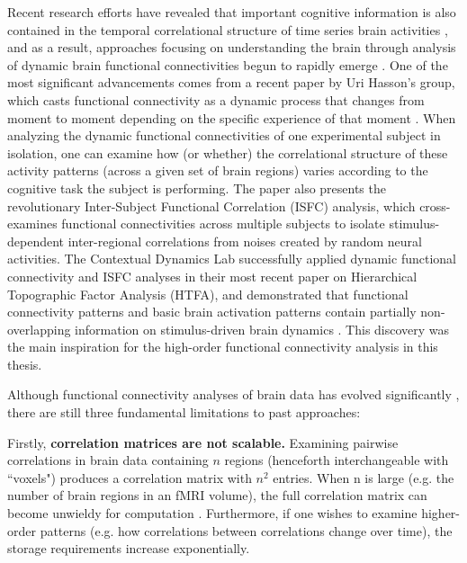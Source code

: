 \documentclass[11pt]{article}
\begin{document}
Recent research efforts have revealed that important cognitive information is also contained in the temporal correlational structure of time series brain activities \citep{davidson2016}, and as a result, approaches focusing on understanding the brain through analysis of dynamic brain functional connectivities begun to rapidly emerge \citep{Nigam2016}\citep{Hutchinson2013}. One of the most significant advancements comes from a recent paper by Uri Hasson's group, which casts functional connectivity as a dynamic process that changes from moment to moment depending on the specific experience of that moment \citep{hasson2016}. When analyzing the dynamic functional connectivities of one experimental subject in isolation, one can examine how (or whether) the correlational structure of these activity patterns (across a given set of brain regions) varies according to the cognitive task the subject is performing. The paper also presents the revolutionary Inter-Subject Functional Correlation (ISFC) analysis, which cross-examines functional connectivities across multiple subjects to isolate stimulus-dependent inter-regional correlations from noises created by random neural activities. The Contextual Dynamics Lab successfully applied dynamic functional connectivity and ISFC analyses in their most recent paper on Hierarchical Topographic Factor Analysis (HTFA), and demonstrated that functional connectivity patterns and basic brain activation patterns contain partially non-overlapping information on stimulus-driven brain dynamics \citep{jeremy2017}. This discovery was the main inspiration for the high-order functional connectivity analysis in this thesis.

Although functional connectivity analyses of brain data has evolved significantly \citep{olaf2005}\citep{khambhati2017}, there are still three fundamental limitations to past approaches:

Firstly, \textbf{correlation matrices are not scalable.} Examining pairwise correlations in brain data containing $n$ regions (henceforth interchangeable with ``voxels") produces a correlation matrix with $n^2$ entries. When n is large (e.g. the number of brain regions in an fMRI volume), the full correlation matrix can become unwieldy for computation \citep{Rubinov2010}\citep{Betzel2017}\citep{Craddock2012}\citep{Yeo2011}. Furthermore, if one wishes to examine higher-order patterns (e.g. how correlations between correlations change over time), the storage requirements increase exponentially.
\end{document}
